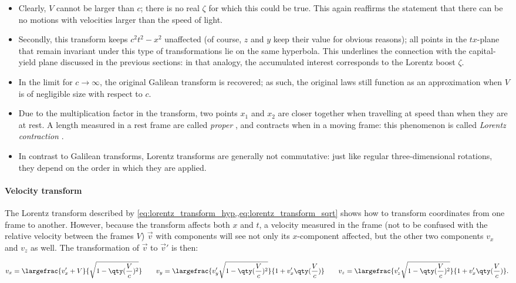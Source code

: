 \begin{itemize}
    \item Clearly, \(V\) cannot be larger than \(c\); there is no real \(\zeta\) for which this could be true. This again reaffirms the statement that there can be no motions with velocities larger than the speed of light.
    \item Secondly, this transform keeps \(c^2t^2 - x^2\) unaffected (of course, \(z\) and \(y\) keep their value for obvious reasons); all points in the \(tx\)-plane that remain invariant under this type of transformations lie on the same hyperbola. This underlines the connection with the capital-yield plane discussed in the previous sections: in that analogy, the accumulated interest corresponds to the Lorentz boost \(\zeta\).
    \item In the limit for \(c \to \infty\), the original Galilean transform is recovered; as such, the original laws still function as an approximation when \(V\) is of negligible size with respect to \(c\).
    \item Due to the multiplication factor in the transform, two points \(x_1\) and \(x_2\) are closer together when travelling at speed than when they are at rest. A length measured in a rest frame are called \emph{proper} , and contracts when in a moving frame: this phenomenon is called \emph{Lorentz contraction}  \cite{Landau1971}.
    \item In contrast to Galilean transforms, Lorentz transforms are generally not commutative: just like regular three-dimensional rotations, they depend on the order in which they are applied.
\end{itemize}
\paragraph{Velocity transform} The Lorentz transform described by \cref{eq:lorentz_transform_hyp,,eq:lorentz_transform_sqrt} shows how to transform coordinates from one frame to another. However, because the transform affects both \(x\) and \(t\), a velocity measured in the frame (not to be confused with the relative velocity between the frames \(V\)) \(\vec{v}\) with components will see not only its \(x\)-component affected, but the other two components \(v_x\) and \(v_z\) as well. The transformation of \(\vec{v}\) to \(\vec{v}'\) is then: \cite{Landau1971}

\begin{equation}
    v_x = \largefrac{v_x' + V}{\sqrt{1 - \qty(\frac{V}{c})^2}}\qquad 
    v_y = \largefrac{v_y'\sqrt{1 - \qty(\frac{V}{c})^2}}{1 + v_x'
    \qty(\frac{V}{c})}\qquad
    v_z = \largefrac{v_z'\sqrt{1 - \qty(\frac{V}{c})^2}}{1 + v_x'\qty(\frac{V}{c})}.
    \label{eq:lorentz_transform_vel}
\end{equation}

